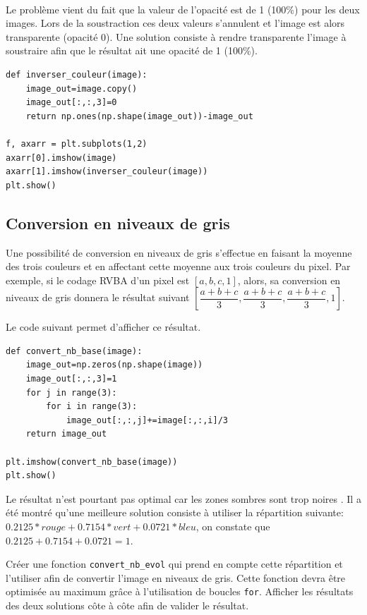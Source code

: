 \begin{solution}~\ \\
Le problème vient du fait que la valeur de l'opacité est de 1 (100\%) pour les deux images. Lors de la soustraction ces deux valeurs s'annulent et l'image est alors transparente (opacité 0). Une solution consiste à rendre transparente l'image à soustraire afin que le résultat ait une opacité de 1 (100\%).
\begin{verbatim}
def inverser_couleur(image):
    image_out=image.copy()
    image_out[:,:,3]=0
    return np.ones(np.shape(image_out))-image_out

f, axarr = plt.subplots(1,2)
axarr[0].imshow(image)
axarr[1].imshow(inverser_couleur(image))
plt.show()
\end{verbatim} 
\end{solution}

\subsection{Conversion en niveaux de gris}

Une possibilité de conversion en niveaux de gris s'effectue en faisant la moyenne des trois couleurs et en affectant cette moyenne aux trois couleurs du pixel. Par exemple, si le codage RVBA d'un pixel est $\left[a,b,c,1\right]$, alors, sa conversion en niveaux de gris donnera le résultat suivant $\left[\dfrac{a+b+c}{3},\dfrac{a+b+c}{3},\dfrac{a+b+c}{3},1\right]$.

Le code suivant permet d'afficher ce résultat.

\begin{verbatim}
def convert_nb_base(image):
    image_out=np.zeros(np.shape(image))
    image_out[:,:,3]=1
    for j in range(3):
        for i in range(3):
            image_out[:,:,j]+=image[:,:,i]/3
    return image_out

plt.imshow(convert_nb_base(image))
plt.show()
\end{verbatim}

Le résultat n'est pourtant pas optimal car les zones sombres sont trop \og noires \fg. Il a été montré qu'une meilleure solution consiste à utiliser la répartition suivante: $0.2125*rouge+0.7154*vert+0.0721*bleu$, on constate que $0.2125+0.7154+0.0721=1$.


\begin{exercice}
Créer une fonction \verb?convert_nb_evol? qui prend en compte cette répartition et l'utiliser afin de convertir l'image en niveaux de gris. Cette fonction devra être optimisée au maximum grâce à l'utilisation de boucles \verb?for?. Afficher les résultats des deux solutions côte à côte afin de valider le résultat.
\end{exercice}

